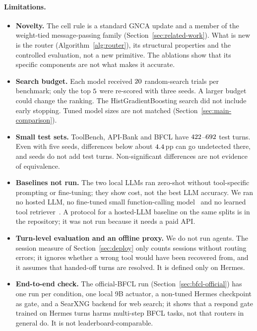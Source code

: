 \documentclass[10pt,twocolumn,letterpaper]{article}
\begin{document}
\paragraph{Limitations.}
\begin{itemize}[leftmargin=1.2em, itemsep=0.1em]
  \item \textbf{Novelty.} The cell rule is a standard GNCA update and a member of the weight-tied message-passing family (Section~\ref{sec:related-work}). What is new is the router (Algorithm~\ref{alg:router}), its structural properties and the controlled evaluation, not a new primitive. The ablations show that its specific components are not what makes it accurate.
  \item \textbf{Search budget.} Each model received $20$ random-search trials per benchmark; only the top $5$ were re-scored with three seeds. A larger budget could change the ranking. The HistGradientBoosting search did not include early stopping. Tuned model sizes are not matched (Section~\ref{sec:main-comparison}).
  \item \textbf{Small test sets.} ToolBench, API-Bank and BFCL have $422$--$692$ test turns. Even with five seeds, differences below about $4.4$\,pp can go undetected there, and seeds do not add test turns. Non-significant differences are not evidence of equivalence.
  \item \textbf{Baselines not run.} The two local LLMs ran zero-shot without tool-specific prompting or fine-tuning; they show cost, not the best LLM accuracy. We ran no hosted LLM, no fine-tuned small function-calling model~\cite{chen2024octopus,erdogan2024tinyagent,lin2024hammer} and no learned tool retriever~\cite{qu2024colt}. A protocol for a hosted-LLM baseline on the same splits is in the repository; it was not run because it needs a paid API.
  \item \textbf{Turn-level evaluation and an offline proxy.} We do not run agents. The session measure of Section~\ref{sec:deploy} only counts sessions without routing errors; it ignores whether a wrong tool would have been recovered from, and it assumes that handed-off turns are resolved. It is defined only on Hermes.
  \item \textbf{End-to-end check.} The official-BFCL run (Section~\ref{sec:bfcl-official}) has one run per condition, one local 9B actuator, a non-tuned Hermes checkpoint as gate, and a SearXNG backend for web search; it shows that a respond gate trained on Hermes turns harms multi-step BFCL tasks, not that routers in general do. It is not leaderboard-comparable.

\end{itemize}
\end{document}
